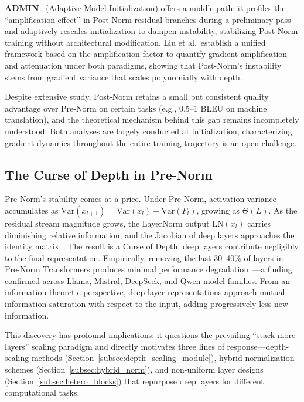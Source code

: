 \textbf{ADMIN}~\cite{liu2020understanding} (Adaptive Model Initialization) offers a middle path: it profiles the ``amplification effect'' in Post-Norm residual branches during a preliminary pass and adaptively rescales initialization to dampen instability, stabilizing Post-Norm training without architectural modification. Liu et al.\ establish a unified framework based on the amplification factor to quantify gradient amplification and attenuation under both paradigms, showing that Post-Norm's instability stems from gradient variance that scales polynomially with depth.

Despite extensive study, Post-Norm retains a small but consistent quality advantage over Pre-Norm on certain tasks (e.g., 0.5--1 BLEU on machine translation), and the theoretical mechanism behind this gap remains incompletely understood. Both analyses are largely conducted at initialization; characterizing gradient dynamics throughout the entire training trajectory is an open challenge.

\subsection{The Curse of Depth in Pre-Norm}
\label{subsec:curse_of_depth}

Pre-Norm's stability comes at a price. Under Pre-Norm, activation variance accumulates as $\mathrm{Var}(x_{l+1}) = \mathrm{Var}(x_l) + \mathrm{Var}(F_l)$, growing as $\Theta(L)$. As the residual stream magnitude grows, the LayerNorm output $\mathrm{LN}(x_l)$ carries diminishing relative information, and the Jacobian of deep layers approaches the identity matrix~\cite{sun2025curse}. The result is a Curse of Depth: deep layers contribute negligibly to the final representation. Empirically, removing the last 30--40\% of layers in Pre-Norm Transformers produces minimal performance degradation~\cite{men2024shortgpt}---a finding confirmed across Llama, Mistral, DeepSeek, and Qwen model families. From an information-theoretic perspective, deep-layer representations approach mutual information saturation with respect to the input, adding progressively less new information.

This discovery has profound implications: it questions the prevailing ``stack more layers'' scaling paradigm and directly motivates three lines of response---depth-scaling methods (Section~\ref{subsec:depth_scaling_module}), hybrid normalization schemes (Section~\ref{subsec:hybrid_norm}), and non-uniform layer designs (Section~\ref{subsec:hetero_blocks}) that repurpose deep layers for different computational tasks.

